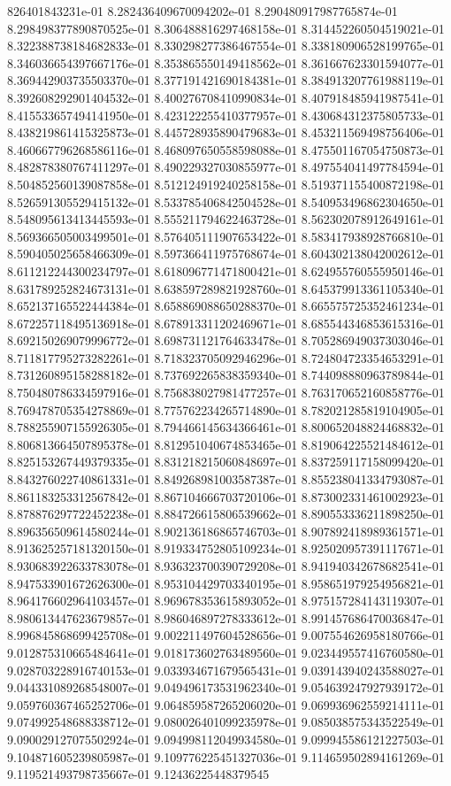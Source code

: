 826401843231e-01	8.282436409670094202e-01	8.290480917987765874e-01	8.298498377890870525e-01	8.306488816297468158e-01	8.314452260504519021e-01	8.322388738184682833e-01	8.330298277386467554e-01	8.338180906528199765e-01	8.346036654397667176e-01	8.353865550149418562e-01	8.361667623301594077e-01	8.369442903735503370e-01	8.377191421690184381e-01	8.384913207761988119e-01	8.392608292901404532e-01	8.400276708410990834e-01	8.407918485941987541e-01	8.415533657494141950e-01	8.423122255410377957e-01	8.430684312375805733e-01	8.438219861415325873e-01	8.445728935890479683e-01	8.453211569498756406e-01	8.460667796268586116e-01	8.468097650558598088e-01	8.475501167054750873e-01	8.482878380767411297e-01	8.490229327030855977e-01	8.497554041497784594e-01	8.504852560139087858e-01	8.512124919240258158e-01	8.519371155400872198e-01	8.526591305529415132e-01	8.533785406842504528e-01	8.540953496862304650e-01	8.548095613413445593e-01	8.555211794622463728e-01	8.562302078912649161e-01	8.569366505003499501e-01	8.576405111907653422e-01	8.583417938928766810e-01	8.590405025658466309e-01	8.597366411975768674e-01	8.604302138042002612e-01	8.611212244300234797e-01	8.618096771471800421e-01	8.624955760555950146e-01	8.631789252824673131e-01	8.638597289821928760e-01	8.645379913361105340e-01	8.652137165522444384e-01	8.658869088650288370e-01	8.665575725352461234e-01	8.672257118495136918e-01	8.678913311202469671e-01	8.685544346853615316e-01	8.692150269079996772e-01	8.698731121764633478e-01	8.705286949037303046e-01	8.711817795273282261e-01	8.718323705092946296e-01	8.724804723354653291e-01	8.731260895158288182e-01	8.737692265838359340e-01	8.744098880963789844e-01	8.750480786334597916e-01	8.756838027981477257e-01	8.763170652160858776e-01	8.769478705354278869e-01	8.775762234265714890e-01	8.782021285819104905e-01	8.788255907155926305e-01	8.794466145634366461e-01	8.800652048824468832e-01	8.806813664507895378e-01	8.812951040674853465e-01	8.819064225521484612e-01	8.825153267449379335e-01	8.831218215060848697e-01	8.837259117158099420e-01	8.843276022740861331e-01	8.849268981003587387e-01	8.855238041334793087e-01	8.861183253312567842e-01	8.867104666703720106e-01	8.873002331461002923e-01	8.878876297722452238e-01	8.884726615806539662e-01	8.890553336211898250e-01	8.896356509614580244e-01	8.902136186865746703e-01	8.907892418989361571e-01	8.913625257181320150e-01	8.919334752805109234e-01	8.925020957391117671e-01	8.930683922633783078e-01	8.936323700390729208e-01	8.941940342678682541e-01	8.947533901672626300e-01	8.953104429703340195e-01	8.958651979254956821e-01	8.964176602964103457e-01	8.969678353615893052e-01	8.975157284143119307e-01	8.980613447623679857e-01	8.986046897278333612e-01	8.991457686470036847e-01	8.996845868699425708e-01	9.002211497604528656e-01	9.007554626958180766e-01	9.012875310665484641e-01	9.018173602763489560e-01	9.023449557416760580e-01	9.028703228916740153e-01	9.033934671679565431e-01	9.039143940243588027e-01	9.044331089268548007e-01	9.049496173531962340e-01	9.054639247927939172e-01	9.059760367465252706e-01	9.064859587265206020e-01	9.069936962559214111e-01	9.074992548688338712e-01	9.080026401099235978e-01	9.085038575343522549e-01	9.090029127075502924e-01	9.094998112049934580e-01	9.099945586121227503e-01	9.104871605239805987e-01	9.109776225451327036e-01	9.114659502894161269e-01	9.119521493798735667e-01	9.12436225448379545